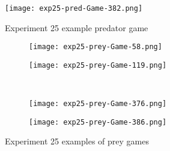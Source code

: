\begin{figure}
  \centering
  \texttt{[image: exp25-pred-Game-382.png]}
  \caption{Experiment 25 example predator game}
  \label{fig:exp25-pred-game-58.png}
\end{figure}

\begin{figure}
  \centering
  \begin{subfigure}{.4\textwidth}
  \texttt{[image: exp25-prey-Game-58.png]}
  \end{subfigure}
  \begin{subfigure}{.4\textwidth}
  \texttt{[image: exp25-prey-Game-119.png]}
  \end{subfigure} \\\hfill
  
  \begin{subfigure}{.4\textwidth}
   \texttt{[image: exp25-prey-Game-376.png]}  
   \end{subfigure}
   \begin{subfigure}{.4\textwidth}
   \texttt{[image: exp25-prey-Game-386.png]}
   \end{subfigure}
  \caption{Experiment 25 examples of prey games}
  \label{fig:exp25-prey-example-games}
\end{figure}
